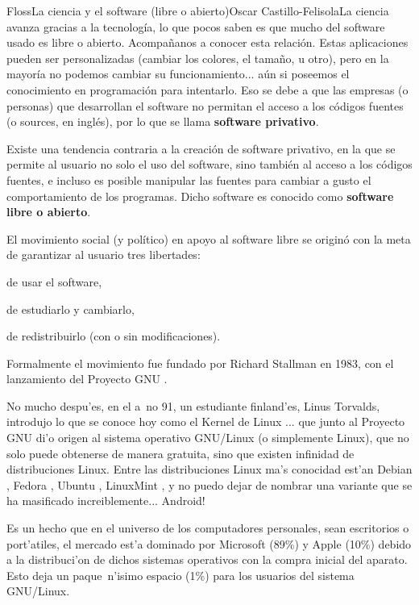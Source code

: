 \begin{Artikel}{Floss}{La ciencia y el software (libre o abierto)}{Oscar Castillo-Felisola}{La ciencia avanza gracias a la tecnolog\'ia, lo que pocos saben es que mucho del software usado es libre o abierto. Acompa\~nanos a conocer esta relaci\'on.}
Estas aplicaciones pueden ser personalizadas (cambiar los colores, el tama\~no, u otro), pero en la mayor\'ia no podemos cambiar su funcionamiento... a\'un si poseemos el conocimiento en programaci\'on para intentarlo. Eso se debe a que las empresas (o personas) que desarrollan el software no permitan el acceso a los c\'odigos fuentes (o sources, en ingl\'es), por lo que se llama {\bf software privativo}.

Existe una tendencia contraria a la creaci\'on de software privativo, en la que se permite al usuario no solo el uso del software, sino tambi\'en al acceso a los c\'odigos fuentes, e incluso es posible manipular las fuentes para cambiar a gusto el comportamiento de los programas. Dicho software es conocido como {\bf software libre o abierto}.



El movimiento social (y pol\'itico)  en apoyo al software libre se origin\'o con la meta de garantizar al usuario tres libertades:
\begin{Auflistung}
\item de usar el software,
\item de estudiarlo y cambiarlo,
\item de redistribuirlo (con o sin modificaciones).
\end{Auflistung}
Formalmente el movimiento fue fundado por Richard Stallman en 1983, con el lanzamiento del Proyecto GNU .

No mucho despu'es, en el  a~no 91, un estudiante finland'es, Linus Torvalds, introdujo lo que se conoce hoy como el Kernel de Linux ... que junto al Proyecto GNU di'o origen al sistema operativo GNU/Linux (o simplemente Linux), que no solo puede obtenerse de manera gratuita, sino que existen infinidad de distribuciones Linux. Entre las distribuciones Linux ma's conocidad est'an Debian , Fedora , Ubuntu , LinuxMint , y no puedo dejar de nombrar una variante que se ha masificado increiblemente... Android! 






Es un hecho que en el universo de los computadores personales, sean escritorios o port'atiles, el mercado est'a dominado por Microsoft (89\%) y Apple (10\%) debido a la distribuci'on de dichos sistemas operativos con la compra inicial del aparato. Esto deja un paque~n'isimo espacio (1\%) para los usuarios del sistema GNU/Linux.


\end{Artikel}
